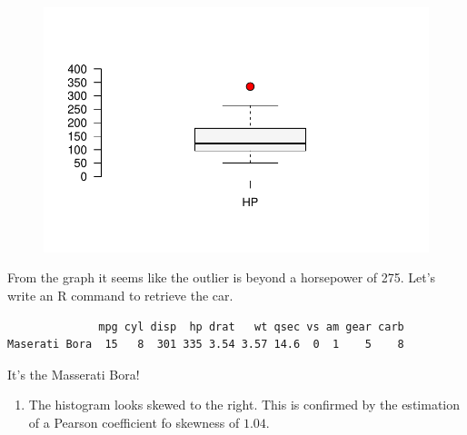 \documentclass[
  letterpaper,
  DIV=11,
  numbers=noendperiod]{scrreprt}
\newenvironment{Shaded}{\begin{snugshade}}{\end{snugshade}}
\newcommand{\DecValTok}[1]{\textcolor[rgb]{0.68,0.00,0.00}{#1}}
\newcommand{\NormalTok}[1]{\textcolor[rgb]{0.00,0.23,0.31}{#1}}
\newcommand{\SpecialCharTok}[1]{\textcolor[rgb]{0.37,0.37,0.37}{#1}}
\providecommand{\tightlist}{%
  \setlength{\itemsep}{0pt}\setlength{\parskip}{0pt}}\usepackage{longtable,booktabs,array}
\begin{document}
\begin{figure}[H]

{\centering \includegraphics{./06-DescriptiveV_files/figure-pdf/unnamed-chunk-9-1.pdf}

}

\end{figure}

From the graph it seems like the outlier is beyond a horsepower of 275.
Let's write an R command to retrieve the car.

\begin{Shaded}
\end{Shaded}

\begin{verbatim}
              mpg cyl disp  hp drat   wt qsec vs am gear carb
Maserati Bora  15   8  301 335 3.54 3.57 14.6  0  1    5    8
\end{verbatim}

It's the Masserati Bora!

\begin{blackbox}

\begin{enumerate}
\def\labelenumi{\arabic{enumi}.}
\setcounter{enumi}{1}
\tightlist
\item
  The histogram looks skewed to the right. This is confirmed by the
  estimation of a Pearson coefficient fo skewness of \(1.04\).
\end{enumerate}

\end{blackbox}
\end{document}
